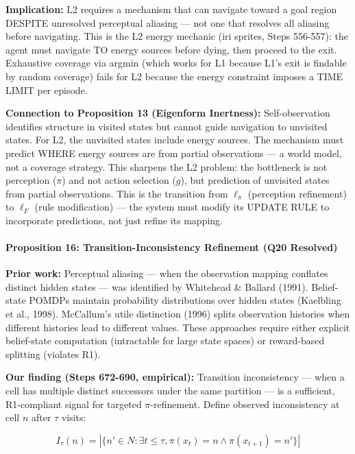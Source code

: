 \documentclass[
  11pt,
]{article}
\begin{document}
\textbf{Implication:} L2 requires a mechanism that can navigate toward a
goal region DESPITE unresolved perceptual aliasing --- not one that
resolves all aliasing before navigating. This is the L2 energy mechanic
(iri sprites, Steps 556-557): the agent must navigate TO energy sources
before dying, then proceed to the exit. Exhaustive coverage via argmin
(which works for L1 because L1's exit is findable by random coverage)
fails for L2 because the energy constraint imposes a TIME LIMIT per
episode.

\textbf{Connection to Proposition 13 (Eigenform Inertness):}
Self-observation identifies structure in visited states but cannot guide
navigation to unvisited states. For L2, the unvisited states include
energy sources. The mechanism must predict WHERE energy sources are from
partial observations --- a world model, not a coverage strategy. This
sharpens the L2 problem: the bottleneck is not perception (\(\pi\)) and
not action selection (\(g\)), but prediction of unvisited states from
partial observations. This is the transition from \(\ell_\pi\)
(perception refinement) to \(\ell_F\) (rule modification) --- the system
must modify its UPDATE RULE to incorporate predictions, not just refine
its mapping.

\paragraph{Proposition 16: Transition-Inconsistency Refinement (Q20
Resolved)}\label{proposition-16-transition-inconsistency-refinement-q20-resolved}

\textbf{Prior work:} Perceptual aliasing --- when the observation
mapping conflates distinct hidden states --- was identified by Whitehead
\& Ballard (1991). Belief-state POMDPs maintain probability
distributions over hidden states (Kaelbling et al., 1998). McCallum's
utile distinction (1996) splits observation histories when different
histories lead to different values. These approaches require either
explicit belief-state computation (intractable for large state spaces)
or reward-based splitting (violates R1).

\textbf{Our finding (Steps 672-690, empirical):} Transition
inconsistency --- when a cell has multiple distinct successors under the
same partition --- is a sufficient, R1-compliant signal for targeted
\(\pi\)-refinement. Define observed inconsistency at cell \(n\) after
\(\tau\) visits:

\[I_\tau(n) = |\{n' \in N : \exists t \leq \tau, \pi(x_t) = n \wedge \pi(x_{t+1}) = n'\}|\]
\end{document}
